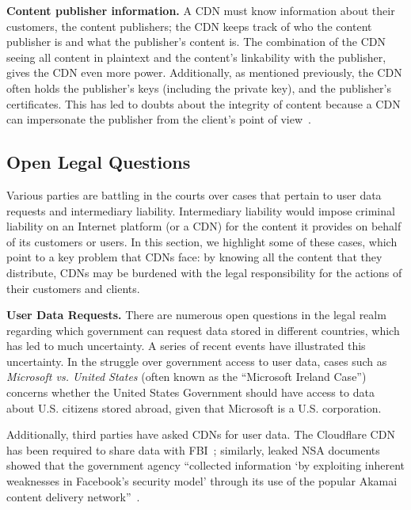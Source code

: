 \textbf{Content publisher information.} A CDN must know information
about their customers, the content
publishers; the CDN keeps track of who the content publisher is and 
what the publisher's content is.  The combination of the CDN seeing all content in plaintext and the content's 
linkability with the publisher, gives the CDN even more power.  Additionally, as mentioned previously, the CDN often 
holds the publisher's keys (including the private key), and the publisher's certificates.  This has led to doubts 
about the integrity of content because a CDN can impersonate the publisher from the client's point of view~\cite{levy2015stickler}.



\subsection{Open Legal Questions}

Various parties are battling in the courts over cases that pertain to user
data requests and intermediary liability.  Intermediary liability would impose
criminal liability on an Internet platform (or a CDN) for the content it
provides on behalf of its customers or users. In this section, we highlight
some of these cases, which point to a key problem that CDNs face: by knowing
all the content that they distribute, CDNs may be burdened with the legal
responsibility for the actions of their customers and clients.

\textbf{User Data Requests.}
There are numerous open questions in the legal realm regarding which government can request data stored in different countries, which 
has led to much uncertainty.  A series of recent events have illustrated this uncertainty.  In the struggle over government access to 
user data, cases such as {\it Microsoft vs. United States} (often known as the ``Microsoft Ireland Case'') concerns whether the United 
States Government should have access to data about U.S. citizens stored abroad, given that Microsoft is a U.S. corporation.  

Additionally, third parties have asked CDNs for user data.  The Cloudflare CDN has
been required
to share data with FBI~\cite{cloudflare_nsl}; similarly, leaked NSA documents showed
that the government agency ``collected information `by exploiting inherent 
weaknesses in Facebook's security model' through its use of the popular Akamai content
delivery network''~\cite{facebook_surv}.

